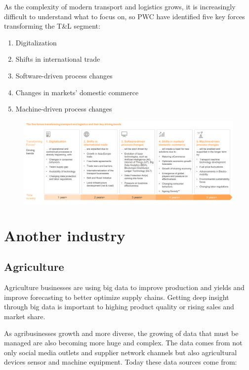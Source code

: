\documentclass[]{book}
\providecommand{\tightlist}{%
  \setlength{\itemsep}{0pt}\setlength{\parskip}{0pt}}
\begin{document}
As the complexity of modern transport and logistics grows, it is
increasingly difficult to understand what to focus on, so PWC have
identified five key forces transforming the T\&L segment:

\begin{enumerate}
\def\labelenumi{\arabic{enumi}.}
\tightlist
\item
  Digitalization
\item
  Shifts in international trade
\item
  Software-driven process changes
\item
  Changes in markets' domestic commerce
\item
  Machine-driven process changes
\end{enumerate}

\begin{figure}
\centering
\includegraphics{pwc3.PNG}
\caption{}
\end{figure}

\section{Another industry}\label{another-industry}

\subsection{Agriculture}\label{agriculture}

Agriculture businesses are using big data to improve production and
yields and improve forecasting to better optimize supply chains. Getting
deep insight through big data is important to highing product quality or
rising sales and market share.

As agribusinesses growth and more diverse, the growing of data that must
be managed are also becoming more huge and complex. The data comes from
not only social media outlets and supplier network channels but also
agricultural devices sensor and machine equipment. Today these data
sources come from:
\end{document}
